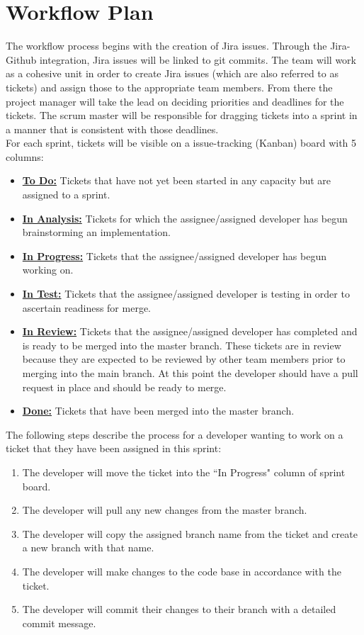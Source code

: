 \documentclass{article}
\begin{document}
\section{Workflow Plan}

The workflow process begins with the creation of Jira issues. Through the Jira-Github integration, Jira issues will be linked to git commits.
The team will work as a cohesive unit in order to create Jira issues (which are also referred to as tickets) and assign those to the appropriate team members. 
From there the project manager will take the lead on deciding priorities and deadlines for the tickets. 
The scrum master will be responsible for dragging tickets into a sprint in a manner that is consistent with those deadlines.\\

For each sprint, tickets will be visible on a issue-tracking (Kanban) board with 5 columns:

\begin{itemize}
	\item \textbf{\underline{To Do:}} Tickets that have not yet been started in any capacity but are assigned to a sprint.
	\item \textbf{\underline{In Analysis:}} Tickets for which the assignee/assigned developer has begun brainstorming an implementation. 
	\item \textbf{\underline{In Progress:}} Tickets that the assignee/assigned developer has begun working on.
	\item \textbf{\underline{In Test:}} Tickets that the assignee/assigned developer is testing in order to ascertain readiness for merge.
	\item \textbf{\underline{In Review:}} Tickets that the assignee/assigned developer has completed and is ready to be merged into the master branch.
	These tickets are in review because they are expected to be reviewed by other team members prior to merging into the main branch. 
	At this point the developer should have a pull request in place and should be ready to merge.
	\item \textbf{\underline{Done:}} Tickets that have been merged into the master branch. 
\end{itemize} 


The following steps describe the process for a developer wanting to work on a ticket that they have been assigned in this sprint:
\begin{enumerate}
	\item The developer will move the ticket into the ``In Progress" column of sprint board.
	\item The developer will pull any new changes from the master branch. 
	\item The developer will copy the assigned branch name from the ticket and create a new branch with that name.
	\item The developer will make changes to the code base in accordance with the ticket.
	\item The developer will commit their changes to their branch with a detailed commit message. 
\end{enumerate}
\end{document}

